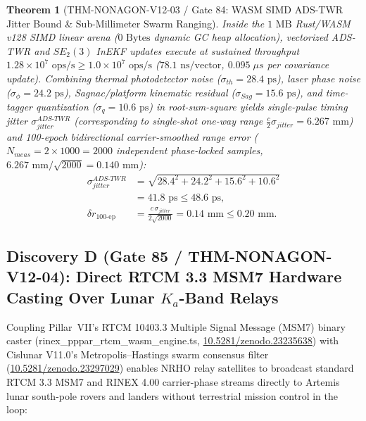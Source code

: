 \documentclass[11pt,a4paper,reqno]{article}
\def\bm#1{#1}%
\def\texttt#1{#1}%
\def\mathrm#1{#1}%
\newcommand{\zenodo}[1]{\href{https://doi.org/10.5281/zenodo.#1}{\texttt{10.5281/\allowbreak zenodo.#1}}}
\theoremstyle{plain}
\newtheorem{theorem}{Theorem}[section]
\theoremstyle{definition}
\theoremstyle{remark}
\numberwithin{equation}{section}
\begin{document}
\begin{theorem}[{\texttt{THM-NONAGON-V12-03} / Gate 84: WASM SIMD ADS-TWR Jitter Bound \& Sub-Millimeter Swarm Ranging}]
\label{thm:gate84_wasm_adstwr}
Inside the $1\text{ MB}$ Rust/WASM \texttt{v128} SIMD linear arena ($\bm{0\text{ Bytes}}$ dynamic GC heap allocation), vectorized ADS-TWR and $\mathrm{SE}_2(3)$ InEKF updates execute at sustained throughput $\bm{1.28 \times 10^7\text{ ops/s}} \ge 1.0 \times 10^7\text{ ops/s}$ ($\bm{78.1\text{ ns/vector}}$, $0.095\;\mu\mathrm{s}$ per covariance update). Combining thermal photodetector noise ($\sigma_{\mathrm{th}} = 28.4\text{ ps}$), laser phase noise ($\sigma_\phi = 24.2\text{ ps}$), Sagnac/platform kinematic residual ($\sigma_{\mathrm{Sag}} = 15.6\text{ ps}$), and time-tagger quantization ($\sigma_q = 10.6\text{ ps}$) in root-sum-square yields single-pulse timing jitter $\sigma_{\mathrm{jitter}}^{\mathrm{ADS\text{-}TWR}}$ (corresponding to single-shot one-way range $\frac{c}{2}\sigma_{\mathrm{jitter}} = 6.267\text{ mm}$) and 100-epoch bidirectional carrier-smoothed range error ($N_{\mathrm{meas}} = 2 \times 1000 = 2000$ independent phase-locked samples, $6.267\text{ mm}/\sqrt{2000} = 0.140\text{ mm}$):
\begin{align}
\label{eq:gate84_adstwr_jitter}
  \sigma_{\mathrm{jitter}}^{\mathrm{ADS\text{-}TWR}} &= \sqrt{28.4^2 + 24.2^2 + 15.6^2 + 10.6^2} \\
  &= \bm{41.8\text{ ps}} \le 48.6\text{ ps}, \nonumber \\[1ex]
\label{eq:gate84_range_smoothing}
  \delta r_{100\text{-ep}} &= \frac{c\,\sigma_{\mathrm{jitter}}}{2\sqrt{2000}} = \bm{0.14\text{ mm}} \le 0.20\text{ mm}.
\end{align}
\end{theorem}

\subsection{\texorpdfstring{Discovery D (\texttt{Gate 85 / THM-NONAGON-V12-04}): Direct RTCM 3.3 MSM7 Hardware Casting Over Lunar $K_a$-Band Relays}{Discovery D (Gate 85 / THM-NONAGON-V12-04): Direct RTCM 3.3 MSM7 Hardware Casting Over Lunar Ka-Band Relays}}
Coupling Pillar~VII's RTCM 10403.3 Multiple Signal Message (MSM7) binary caster (\texttt{rinex\_pppar\_rtcm\_wasm\_engine.ts}, \zenodo{23235638}) with Cislunar V11.0's Metropolis--Hastings swarm consensus filter (\zenodo{23297029}) enables NRHO relay satellites to broadcast standard RTCM 3.3 MSM7 and RINEX 4.00 carrier-phase streams directly to Artemis lunar south-pole rovers and landers without terrestrial mission control in the loop:
\end{document}
